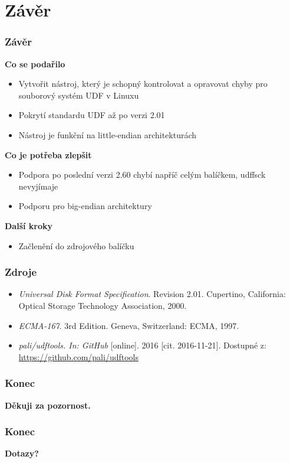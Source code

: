 \documentclass[aspectratio=169]{beamer}
\begin{document}
    \section{Závěr}
		\begin{frame}
			\frametitle{Závěr}
			\vspace{40 pt}
			\Large\textbf{Co se podařilo}
			\begin{itemize}
				\item\Large Vytvořit nástroj, který je schopný kontrolovat a opravovat chyby pro souborový systém UDF v Linuxu 
				\item\Large Pokrytí standardu UDF až po verzi 2.01
				\item\Large Nástroj je funkční na little-endian architekturách
			\end{itemize}
			\Large\textbf{Co je potřeba zlepšit}
			\begin{itemize}
				\item\Large Podpora po poslední verzi 2.60 chybí napříč celým balíčkem, udffsck nevyjímaje
				\item\Large Podporu pro big-endian architektury
			\end{itemize}
			\Large\textbf{Další kroky}
			\begin{itemize}
				\item\Large Začlenění do zdrojového balíčku
			\end{itemize}
		\end{frame}
	    
        \begin{frame}
			\frametitle{Zdroje}
			\vspace{40 pt}
            \begin{itemize}
                \item\emph{Universal Disk Format Specification}. Revision 2.01. Cupertino, California: Optical Storage Technology Association, 2000.
                \item\emph{ECMA-167}. 3rd Edition. Geneva, Switzerland: ECMA, 1997.
                \item\emph{pali/udftools. In: GitHub}\/ [online]. 2016 [cit. 2016-11-21]. Dostupné z: \url{https://github.com/pali/udftools}
            \end{itemize}
		\end{frame}

		\begin{frame}
			\frametitle{Konec}
			\center
			\vspace{40 pt}
			\Huge\textbf{Děkuji za pozornost.}
		\end{frame}

		\begin{frame}
			\frametitle{Konec}
			\center
			\vspace{40 pt}
			\Huge\textbf{Dotazy?}
		\end{frame}
\end{document}
